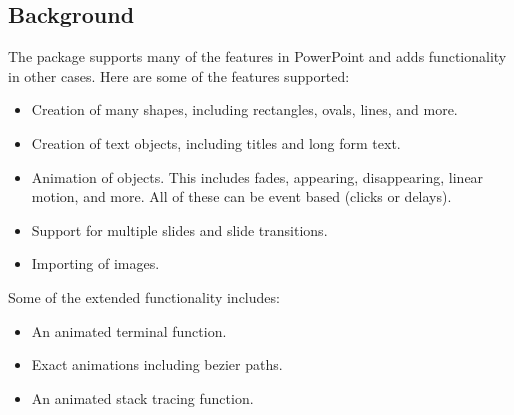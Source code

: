 \documentclass[12pt,twoside]{reedthesis}
\begin{document}
\subsection{Background}
The package supports many of the features in PowerPoint and adds functionality in other cases. Here are some of the features supported:
\begin{itemize}
\item Creation of many shapes, including rectangles, ovals, lines, and more. 
\item Creation of text objects, including titles and long form text. 
\item Animation of objects. This includes fades, appearing, disappearing, linear motion, and more. All of these can be event based (clicks or delays). 
\item Support for multiple slides and slide transitions.
\item Importing of images.
\end{itemize}
Some of the extended functionality includes:
\begin{itemize}
\item An animated terminal function.
\item Exact animations including bezier paths. 
\item An animated stack tracing function.
\end{itemize}
\end{document}
